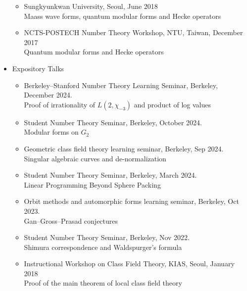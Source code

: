 \documentclass[letterpaper,11pt]{article}
\begin{document}
\begin{itemize}
\begin{itemize}
		\item Sungkyunkwan University, Seoul, June 2018\\
		Maass wave forms, quantum modular forms and Hecke operators
		\item NCTS-POSTECH Number Theory Workshop, NTU, Taiwan, December 2017\\ Quantum modular forms and Hecke operators
	\end{itemize}
	\item Expository Talks
	\begin{itemize}
		\item Berkeley--Stanford Number Theory Learning Seminar, Berkeley, December 2024.\\
		Proof of irrationality of $L(2, \chi_{-3})$ and product of log values
		\item Student Number Theory Seminar, Berkeley, October 2024.\\
		Modular forms on $G_2$
		\item Geometric class field theory learning seminar, Berkeley, Sep 2024. \\
		Singular algebraic curves and de-normalization
		\item Student Number Theory Seminar, Berkeley, March 2024.\\
		Linear Programming Beyond Sphere Packing
		\item Orbit methods and automorphic forms learning seminar, Berkeley, Oct 2023. \\
		Gan--Gross--Prasad conjectures
		\item Student Number Theory Seminar, Berkeley, Nov 2022.\\
		Shimura correspondence and Waldspurger's formula
		\item Instructional Workshop on Class Field Theory, KIAS, Seoul, January 2018\\
		Proof of the main theorem of local class field theory
	\end{itemize}
\end{itemize}
\end{document}
